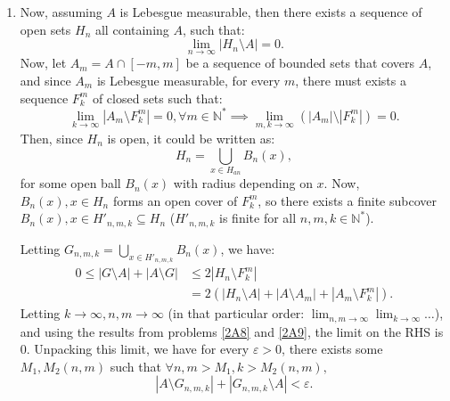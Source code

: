 \begin{enumerate}[label=\textbf{2D.\arabic*}]
\begin{enumerate}[label=(\alph*)]
  \item
  Now, assuming \( A \) is Lebesgue measurable, then there exists a
  sequence of open sets \( H_{n} \) all containing \( A \), such that:
  \begin{equation}
    \label{eq:2d8-1}
    \lim_{n \to \infty} |H_{n} \setminus A| = 0.
  \end{equation}
  Now, let \( A_{m} = A \cap [-m, m] \) be a sequence of bounded sets that
  covers \( A \), and since \( A_{m} \) is Lebesgue measurable, for every \( m
  \), there must exists a sequence \( F^{m}_{k} \) of closed sets such that:
  \begin{equation}
    \label{eq:2d8-2}
    \lim_{k \to \infty} |A_{m} \setminus F^{m}_{k}| = 0, \forall m \in
    \mathbb{N}^{*} \implies \lim_{m, k \to \infty} (|A_{m}| \setminus
    |F^{m}_{k}|) = 0.
  \end{equation}
  Then, since \( H_{n} \) is open, it could be written as:
  \[
    H_{n} = \bigcup_{x \in H_{an}} B_{n}(x)
  ,\] for some open ball \( B_{n}(x) \) with radius depending on \( x \). Now,
  \( B_{n}(x), x \in H_{n} \) forms an open cover of \( F^{m}_{k} \), so there
  exists a finite subcover \( B_{n}(x), x \in H'_{n, m, k} \subseteq H_{n} \) (\(
  H'_{n, m, k}
  \) is finite for all \( n, m, k \in \mathbb{N}^{*} \)).

  Letting \( G_{n, m, k} = \bigcup_{x \in H'_{n, m, k}} B_{n}(x) \), we have:
  \begin{align*}
    0 \le |G \setminus A| + |A \setminus G| &\le 2|H_{n} \setminus F^{m}_{k}| \\
    &= 2(|H_{n}\setminus A| + |A \setminus A_{m}| + |A_{m} \setminus
    F^{m}_{k}|)
  .\end{align*}
  Letting \( k \to \infty, n, m \to \infty \) (in that particular
  order: \( \lim_{n,m \to \infty} \lim_{k \to \infty} \ldots  \)), and using the
  results from problems \ref{2A8} and \ref{2A9}, the limit on the RHS is
  \( 0 \). Unpacking this limit, we have for every \( \varepsilon > 0 \), there
  exists some \( M_{1}, M_{2}(n, m) \) such that \( \forall n, m > M_{1}, k > M_{2}(n,
  m), \)
  \[
    |A \setminus G_{n, m, k}| + |G_{n, m, k} \setminus A| < \varepsilon
  .\] 
  \end{enumerate}


\end{enumerate}
